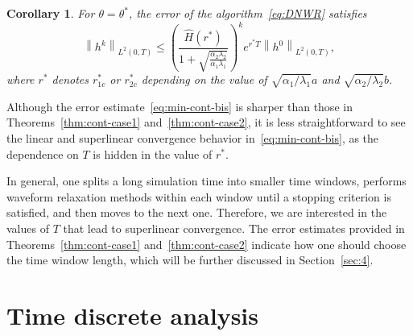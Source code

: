 \documentclass[reqno]{amsart}
\newtheorem{corollary}{Corollary}
\newcommand{\norm}[1]{\left\lVert#1\right\rVert}
\begin{document}
\begin{corollary}\label{thm:min-cont-bis}
For $\theta = \theta^*$, the error of the algorithm~\eqref{eq:DNWR} satisfies 
\begin{equation}\label{eq:min-cont-bis}
\norm{h^k}_{L^2(0, T)} 
\leq \left(\frac{ \hat H(r^*)}{1+\sqrt{\frac{\alpha_2\lambda_2}{\alpha_1\lambda_1}}}\right)^k e^{r^*T}\norm{h^0}_{L^2(0, T)},
\end{equation} 
where $r^*$ denotes $r_{1c}^*$ or $r_{2c}^*$ depending on the value of $\sqrt{\alpha_1/\lambda_1} a$ and $\sqrt{\alpha_2/\lambda_2} b$. 
\end{corollary}

Although the error estimate~\eqref{eq:min-cont-bis} is sharper than those in Theorems~\ref{thm:cont-case1} and~\ref{thm:cont-case2}, it is less straightforward to see the linear and superlinear convergence behavior in~\eqref{eq:min-cont-bis}, as the dependence on $T$ is hidden in the value of $r^*$. 

In general, one splits a long simulation time into smaller time windows, performs waveform relaxation methods within each window until a stopping criterion is satisfied, and then moves to the next one. Therefore, we are interested in the values of $T$ that lead to superlinear convergence. The error estimates provided in Theorems~\ref{thm:cont-case1} and~\ref{thm:cont-case2} indicate how one should choose the time window length, which will be further discussed in Section~\ref{sec:4}.
\section{Time discrete analysis}\label{sec:3}
\end{document}
